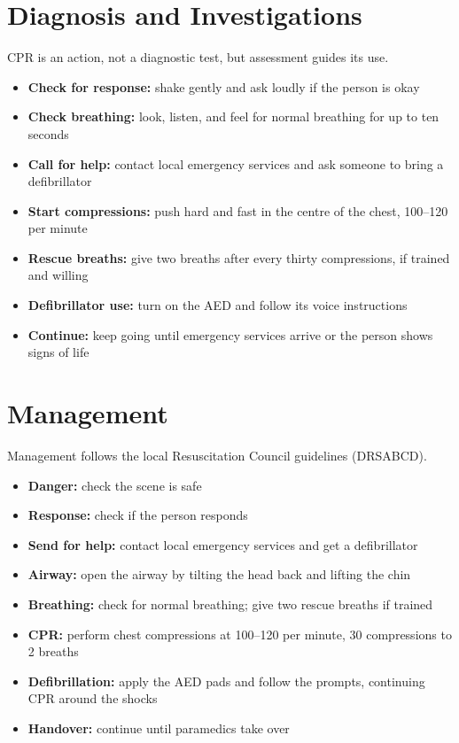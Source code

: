 \section*{Diagnosis and Investigations}
CPR is an action, not a diagnostic test, but assessment guides its use.

\begin{itemize}
    \item \textbf{Check for response:} shake gently and ask loudly if the person is okay
    \item \textbf{Check breathing:} look, listen, and feel for normal breathing for up to ten seconds
    \item \textbf{Call for help:} contact local emergency services and ask someone to bring a defibrillator
    \item \textbf{Start compressions:} push hard and fast in the centre of the chest, 100--120 per minute
    \item \textbf{Rescue breaths:} give two breaths after every thirty compressions, if trained and willing
    \item \textbf{Defibrillator use:} turn on the AED and follow its voice instructions
    \item \textbf{Continue:} keep going until emergency services arrive or the person shows signs of life
\end{itemize}

\section*{Management}
Management follows the local Resuscitation Council guidelines (DRSABCD).

\begin{itemize}
    \item \textbf{Danger:} check the scene is safe
    \item \textbf{Response:} check if the person responds
    \item \textbf{Send for help:} contact local emergency services and get a defibrillator
    \item \textbf{Airway:} open the airway by tilting the head back and lifting the chin
    \item \textbf{Breathing:} check for normal breathing; give two rescue breaths if trained
    \item \textbf{CPR:} perform chest compressions at 100--120 per minute, 30 compressions to 2 breaths
    \item \textbf{Defibrillation:} apply the AED pads and follow the prompts, continuing CPR around the shocks
    \item \textbf{Handover:} continue until paramedics take over
\end{itemize}

